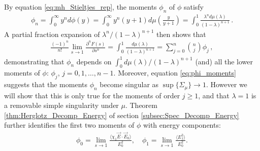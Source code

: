 \documentclass[english,12pt]{ttuthes}
\begin{document}
By equation \eqref{eq:mh_Stieltjes_rep}, the moments $\phi_n$ of $\phi$
satisfy  
%
\begin{align}\label{eq:phi_moments}
  \phi_n=\int_0^\infty y^nd\phi(y)
    =\int_0^\infty y^n(y+1)d\mu\left(\frac{y}{y+1}\right)
    =\int_0^1\frac{\lambda^nd\mu(\lambda)}{(1-\lambda)^{n+1}}\,.
\end{align}
%
A partial fraction expansion of $\lambda^n/(1-\lambda)^{n+1}$ then shows that
%
\begin{align}\label{eq:phi_moments_F(s)}
  \frac{(-1)^n}{n!}\lim_{s\to1}\frac{\partial^nF(s)}{\partial s^n}=\int_0^1\frac{d\mu(\lambda)}{(1-\lambda)^{n+1}}
                                =\sum_{j=0}^n{n \choose j} \phi_j\,,
\end{align}
%
demonstrating that $\phi_n$ depends on $\int_0^1d\mu(\lambda)/(1-\lambda)^{n+1}$
(and) all the lower moments of $\phi$: $\phi_j$, $j=0,1,\ldots,n-1$. Moreover,
equation \eqref{eq:phi_moments} suggests that the moments $\phi_n$ become
singular as $\sup\{\Sigma_\mu\}\to1$. However
we will show that this is only true for the moments of order $j\geq1$,
and that $\lambda=1$ is a removable simple singularity under $\mu$. Theorem
\ref{thm:Herglotz_Decomp_Energy} of section
\ref{subsec:Spec_Decomp_Energy} further identifies the first two
moments of $\phi$ with energy components: 
%
\begin{align}\label{eq:phi_energy_relations}
  \phi_0=\lim_{s\to1}\frac{\langle\chi_1\vec{E}\cdot\vec{E}_0\rangle}{E_0^2},   \quad
  \phi_1=\lim_{s\to1}\frac{\langle E_f^2\rangle}{E_0^2}.
\end{align}
%
\end{document}
